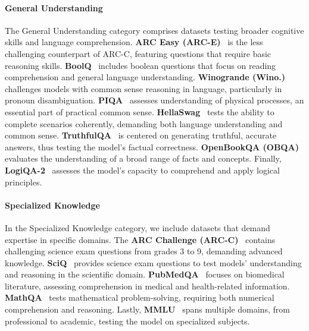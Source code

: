 \paragraph{General Understanding}
The General Understanding category comprises datasets testing broader cognitive skills and language comprehension. \textbf{ARC Easy (ARC-E)}~\citep{allenai:arc} is the less challenging counterpart of ARC-C, featuring questions that require basic reasoning skills. \textbf{BoolQ}~\citep{clark-etal-2019-boolq} includes boolean questions that focus on reading comprehension and general language understanding. \textbf{Winogrande (Wino.)}~\citep{ai2:winogrande} challenges models with common sense reasoning in language, particularly in pronoun disambiguation. \textbf{PIQA}~\citep{Bisk2020} assesses understanding of physical processes, an essential part of practical common sense. \textbf{HellaSwag}~\citep{zellers2019hellaswag} tests the ability to complete scenarios coherently, demanding both language understanding and common sense. \textbf{TruthfulQA}~\citep{lin2021truthfulqa} is centered on generating truthful, accurate answers, thus testing the model's factual correctness. \textbf{OpenBookQA (OBQA)}~\citep{OpenBookQA2018} evaluates the understanding of a broad range of facts and concepts. Finally, \textbf{LogiQA-2}~\citep{logiqa2} assesses the model's capacity to comprehend and apply logical principles.

\paragraph{Specialized Knowledge}
In the Specialized Knowledge category, we include datasets that demand expertise in specific domains. The \textbf{ARC Challenge (ARC-C)}~\citep{allenai:arc} contains challenging science exam questions from grades 3 to 9, demanding advanced knowledge. \textbf{SciQ}~\citep{SciQ} provides science exam questions to test models' understanding and reasoning in the scientific domain. \textbf{PubMedQA}~\citep{jin2019pubmedqa} focuses on biomedical literature, assessing comprehension in medical and health-related information. 
\textbf{MathQA}~\citep{amini-etal-2019-mathqa} tests mathematical problem-solving, requiring both numerical comprehension and reasoning. Lastly, \textbf{MMLU}~\citep{hendryckstest2021} spans multiple domains, from professional to academic, testing the model on specialized subjects.




